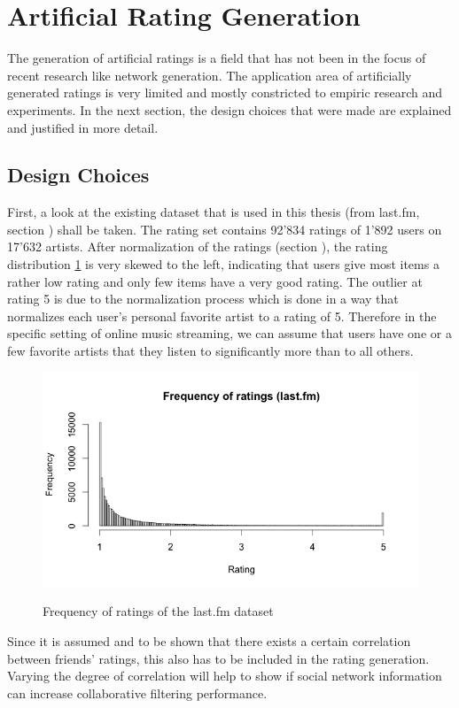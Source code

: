 \section{Artificial Rating Generation}
\label{st:artificialratinggeneration} The generation of artificial ratings is a field that has not been in the focus of recent research like network generation. The application area of artificially generated ratings is very limited and mostly constricted to empiric research and experiments. In the next section, the design choices that were made are explained and justified in more detail.

\subsection{Design Choices}
\label{sst:designchoices} First, a look at the existing dataset that is used in this thesis (from last.fm, section %
) shall be taken. The rating set contains 92'834 ratings of 1'892 users on 17'632 artists. After normalization of the ratings (section %
), the rating distribution \ref{f:frequencyofratings} is very skewed to the left, indicating that users give most items a rather low rating and only few items have a very good rating. The outlier at rating 5 is due to the normalization process which is done in a way that normalizes each user's personal favorite artist to a rating of 5. Therefore in the specific setting of online music streaming, we can assume that users have one or a few favorite artists that they listen to significantly more than to all others.

\begin{figure}[!ht]
\centering
\includegraphics[width=425px]{./3-artificialdata/figures/FrequencyOfRatings_Lastfm.png}
\label{f:frequencyofratings}
\caption{Frequency of ratings of the last.fm dataset}
\end{figure}

Since it is assumed and to be shown that there exists a certain correlation between friends' ratings, this also has to be included in the rating generation. Varying the degree of correlation will help to show if social network information can increase collaborative filtering performance.